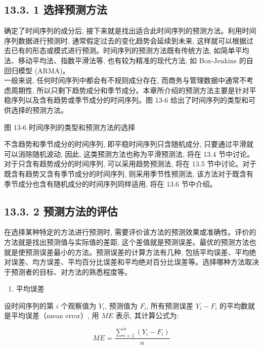 \documentclass[10pt]{article}
\begin{document}
\begin{CJK*}{UTF8}{bsmi}
\subsection*{13.3. 1 选择预测方法}
确定了时间序列的成分后, 接下来就是找出适合此时间序列的预测方法。利用时间序列数据进行预测时, 通常假定过去的变化趋势会延续到未来, 这样就可以根据过去已有的形态或模式进行预测。时间序列的预测方法既有传统方法, 如简单平均法、移动平均法、指数平滑法等, 也有较为精准的现代方法, 如 Box-Jenkins 的自回归模型 (ARMA)。\\
一般来说, 任何时间序列中都会有不规则成分存在, 而商务与管理数据中通常不考虑周期性, 所以只剩下趋势成分和季节成分。本章所介绍的预测方法主要是针对平稳序列以及含有趋势或季节成分的时间序列。图 13-6 给出了时间序列的类型和可供选择的预测方法。

\begin{center}
\end{center}

图 13-6 时间序列的类型和预测方法的选择

不含趋势和季节成分的时间序列, 即平稳时间序列只含随机成分, 只要通过平滑就可以消除随机波动, 因此, 这类预测方法也称为平滑预测法, 将在 13.4 节中讨论。对于只含有趋势成分的时间序列, 可以采用趋势预测法, 将在 13.5 节中讨论。对于既含有趋势又含有季节成分的时间序列, 则采用季节性预测法, 该方法对于既含有季节成分也含有随机成分的时间序列同样适用, 将在 13.6 节中介绍。

\subsection*{13.3. 2 预测方法的评估}
在选择某种特定的方法进行预测时, 需要评价该方法的预测效果或准确性。评价的方法就是找出预测值与实际值的差距, 这个差值就是预测误差。最优的预测方法也就是使预测误差最小的方法。预测误差的计算方法有几种, 包括平均误差、平均绝对误差、均方误差、平均百分比误差和平均绝对百分比误差等。选择哪种方法取决于预测者的目标、对方法的熟悉程度等。

\begin{enumerate}
  \item 平均误差
\end{enumerate}

设时间序列的第 $i$ 个观察值为 $Y_{i}$, 预测值为 $F_{i}$, 所有预测误差 $Y_{i}-F_{i}$ 的平均数就是平均误差（mean error）, 用 $M E$ 表示, 其计算公式为:


\begin{equation*}
M E=\frac{\sum_{i=1}^{n}\left(Y_{i}-F_{i}\right)}{n} \tag{13.6}
\end{equation*}



\end{CJK*}
\end{document}
